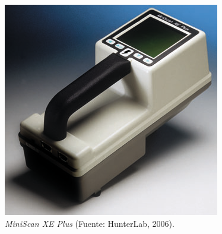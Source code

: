 			\begin{figure}[H]
		\centering
		\includegraphics[scale=1]{img/MiniScanXEPlus.png}
			\caption[MiniScan XE Plus]{\textit{MiniScan XE Plus} (Fuente: HunterLab, 2006).}
	\end{figure}